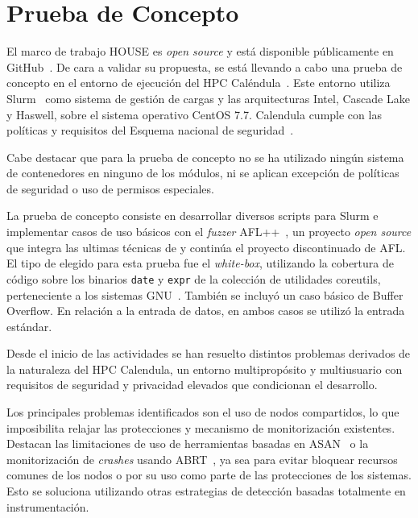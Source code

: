 \documentclass[10pt,conference,a4paper]{IEEEtran}
\begin{document}

\section{Prueba de Concepto}
\label{Prueba_de_concepto}

El marco de trabajo HOUSE es \textit{open source} y está disponible públicamente en GitHub~\cite{HOUSE_ref-github_repo}. De cara a validar su propuesta, se está llevando a cabo una prueba de concepto en el entorno de ejecución del HPC Caléndula~\cite{HPC_Leon}. Este entorno utiliza Slurm~\cite{HPC_tool_slurm} como sistema de gestión de cargas y las arquitecturas Intel, Cascade Lake y Haswell, sobre el sistema operativo CentOS 7.7. Calendula cumple con las políticas y requisitos del Esquema nacional de seguridad~\cite{ens_ref-boe}.

Cabe destacar que para la prueba de concepto no se ha utilizado ningún sistema de contenedores en ninguno de los módulos, ni se aplican excepción de políticas de seguridad o uso de permisos especiales.

La prueba de concepto consiste en desarrollar diversos scripts para Slurm e implementar casos de uso básicos con el \textit{fuzzer} AFL++~\cite{fuzz_tool_afl++}, un proyecto \textit{open source} que integra las ultimas técnicas de {\fz} y continúa el proyecto discontinuado de AFL. El tipo de {\fz} elegido para esta prueba fue el \textit{white-box}, utilizando la cobertura de código sobre los binarios \texttt{date} y \texttt{expr} de la colección de utilidades coreutils, perteneciente a los sistemas GNU~\cite{sut_coreutils}. También se incluyó un caso básico de Buffer Overflow. En relación a la entrada de datos, en ambos casos se utilizó la entrada estándar.

Desde el inicio de las actividades se han resuelto distintos problemas derivados de la naturaleza del HPC Calendula, un entorno multipropósito y multiusuario con requisitos de seguridad y privacidad elevados que condicionan el desarrollo.

Los principales problemas identificados son el uso de nodos compartidos, lo que imposibilita relajar las protecciones y mecanismo de monitorización existentes. Destacan las limitaciones de uso de herramientas basadas en ASAN~\cite{ASAN_ref-paper} o la monitorización de \textit{crashes} usando ABRT~\cite{abrt_doc-redhat}, ya sea para evitar bloquear recursos comunes de los nodos o por su uso como parte de las protecciones de los sistemas. Esto se soluciona utilizando otras estrategias de detección basadas totalmente en instrumentación.
\end{document}
